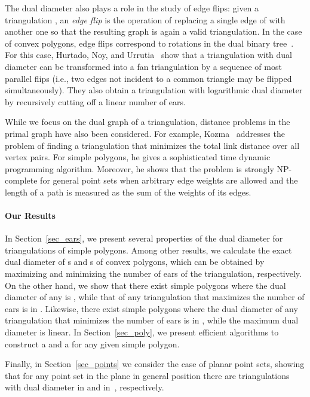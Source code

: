 \documentclass{article}
\begin{document}
The dual diameter also plays a role in the study of edge flips: 
given a triangulation , an \emph{edge flip} is the operation of replacing
a single edge of  with another one so that the resulting graph
is again a valid triangulation.
In the case of convex polygons, edge flips correspond to rotations in the
dual binary tree~\cite{sleator_tarjan_thurston}.
For this case, Hurtado, Noy, and 
Urrutia~\cite{hurtado_noy_urrutia, urrutia_flip_talk} show that a 
triangulation with dual diameter  can be transformed into a fan 
triangulation by a sequence of most  parallel flips (i.e., two 
edges not incident to a common  triangle may be flipped simultaneously).
They also obtain a triangulation with logarithmic dual diameter 
by recursively cutting off a linear number of ears.

While we focus on the dual graph of a triangulation, distance
problems in the primal graph have also been considered.
For example, Kozma~\cite{kozma} addresses the problem of finding a 
triangulation 
that minimizes the total link distance over all vertex pairs.
For simple polygons, he gives a sophisticated  time 
dynamic programming algorithm.
Moreover, he shows that the problem is strongly NP-complete for 
general point sets when arbitrary edge weights are allowed
and the length of a path is measured as the sum of the
weights of its edges.

\paragraph{Our Results}
In Section~\ref{sec_ears}, we present several properties of the dual 
diameter for triangulations of simple polygons.
Among other results, we calculate the exact dual diameter of s and 
s of convex polygons, which
can be obtained by maximizing and minimizing the number of ears of the 
triangulation, respectively.
On the other hand, we show that there exist simple polygons where 
the dual diameter of any  is , while that 
of any triangulation that maximizes the number of ears is in .
Likewise, there exist simple polygons where the dual diameter of any 
triangulation that minimizes the number of ears is in , 
while the maximum dual diameter is linear.
In Section~\ref{sec_poly}, we present efficient algorithms to construct a 
 and a  for any given simple polygon.

Finally, in Section~\ref{sec_points} we consider the case of planar
point sets, showing that for any point set in the plane in general position there
are triangulations with dual diameter in
 and in~, respectively.
\end{document}
